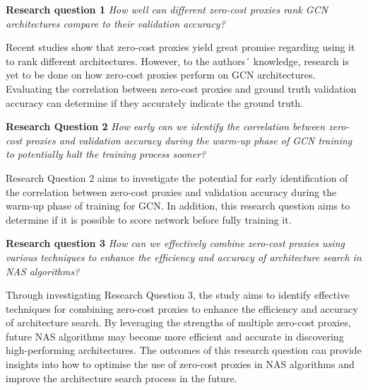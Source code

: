 \textbf{Research question 1} \textit{How well can different zero-cost proxies rank GCN architectures compare to their validation accuracy?}

Recent studies \autocite{abdelfattah2021zero, colin2022adeeperlook} show that zero-cost proxies yield great promise regarding using it to rank different architectures. However, to the authors´ knowledge, research is yet to be done on how zero-cost proxies perform on GCN architectures. Evaluating the correlation between zero-cost proxies and ground truth validation accuracy can determine if they accurately indicate the ground truth.


\textbf{Research Question 2} \textit{How early can we identify the correlation between zero-cost proxies and validation accuracy during the warm-up phase of GCN training to potentially halt the training process sooner?}


Research Question 2 aims to investigate the potential for early identification of the correlation between zero-cost proxies and validation accuracy during the warm-up phase of training for GCN. In addition, this research question aims to determine if it is possible to score network before fully training it. 


\textbf{Research question 3} \textit{How can we effectively combine zero-cost proxies using various techniques to enhance the efficiency and accuracy of architecture search in NAS algorithms?}

Through investigating Research Question 3, the study aims to identify effective techniques for combining zero-cost proxies to enhance the efficiency and accuracy of architecture search. By leveraging the strengths of multiple zero-cost proxies, future NAS algorithms may become more efficient and accurate in discovering high-performing architectures. The outcomes of this research question can provide insights into how to optimise the use of zero-cost proxies in NAS algorithms and improve the architecture search process in the future.
